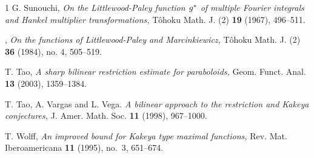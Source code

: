 \documentclass[11pt]{amsart}
\theoremstyle{definition}
\numberwithin{theorem}{section}
\numberwithin{definition}{section}
\def\emph#1{{\it #1 }}
\begin{document}
\begin{thebibliography}{1}
 G. Sunouchi,
\emph{On the Littlewood-Paley function $g\sp*$ of
multiple Fourier integrals and Hankel multiplier transformations,}
 T\^ohoku Math. J. (2)  {\bf 19}  (1967), 496--511.

 \bysame,
\emph{On the functions of Littlewood-Paley and Marcinkiewicz,}  T\^ohoku Math. J. (2)  {\bf 36}  (1984),  no. 4, 505--519.

 T. Tao,
\emph{A sharp  bilinear restriction estimate for paraboloids,} Geom.
Funct. Anal. {\bf 13} (2003), 1359--1384.



T. Tao, A. Vargas and L. Vega. \emph{A bilinear approach to the
restriction and Kakeya conjectures,} J. Amer. Math. Soc.  {\bf 11}
(1998), 967--1000.






 T. Wolff, \emph{An improved bound for Kakeya type maximal functions,} Rev. Mat. Iberoamericana {\bf 11} (1995), no.~3, 651--674.


\end{thebibliography}
\end{document}
